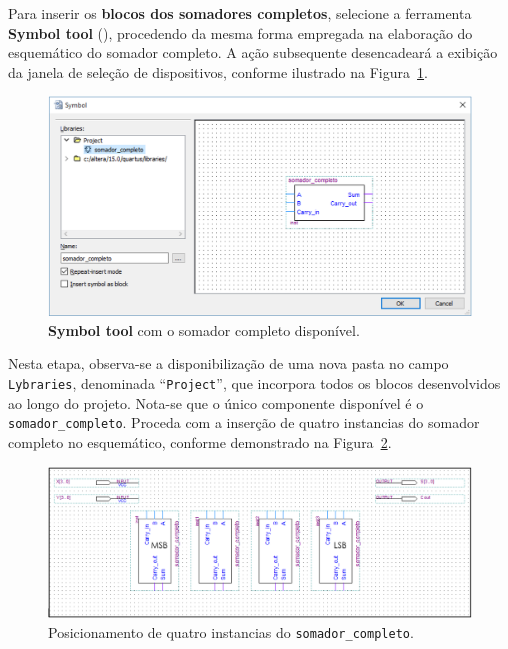\documentclass[12pt,a4paper]{article}
\begin{document}
Para inserir os \textbf{blocos dos somadores completos}, selecione a ferramenta \textbf{Symbol tool} (), procedendo da mesma forma empregada na elaboração do esquemático do somador completo. A ação subsequente desencadeará a exibição da janela de seleção de dispositivos, conforme ilustrado na Figura~\ref{fig:symbolSomador}.

\begin{figure}[htbp!]
    \centering
    \includegraphics[width=\textwidth]{./figs/symbolSomador.png}
    \caption{\textbf{Symbol tool} com o somador completo disponível.}
    \label{fig:symbolSomador}
\end{figure}

Nesta etapa, observa-se a disponibilização de uma nova pasta no campo \texttt{Lybraries}, denominada ``\texttt{Project}'', que incorpora todos os blocos desenvolvidos ao longo do projeto. Nota-se que o único componente disponível é o \texttt{somador\_completo}. Proceda com a inserção de quatro instancias do somador completo no esquemático, conforme demonstrado na Figura~\ref{fig:18}.

\begin{figure}[htbp!]
    \centering
    \includegraphics[width=\textwidth]{./figs/fig18.png}
    \caption{Posicionamento de quatro instancias do \texttt{somador\_completo}.}
    \label{fig:18}
\end{figure}
\end{document}
